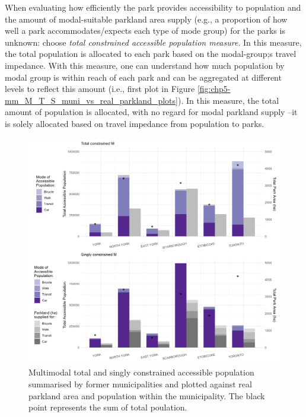 \documentclass[
11pt, %
oneside, %
english, %
singlespacing, %
]{macthesis} %
\begin{document}
When evaluating how efficiently the park provides accessibility to population and the amount of modal-suitable parkland area supply (e.g., a proportion of how well a park accommodates/expects each type of mode group) for the parks is unknown: choose \emph{total constrained accessible population measure}. In this measure, the total population is allocated to each park based on the modal-group;s travel impedance. With this measure, one can understand how much population by modal group is within reach of each park and can be aggregated at different levels to reflect this amount (i.e., first plot in Figure \ref{fig:chp5-mm_M_T_S_muni_vs_real_parkland_plots}). In this measure, the total amount of population is allocated, with no regard for modal parkland supply --it is solely allocated based on travel impedance from population to parks.

\begin{figure}

{\centering \includegraphics[width=6in]{./data/figures/chp5-mm_M_T_S_muni_vs_real_parkland_plots} 

}

\caption{\label{fig:chp5-mm_M_T_S_muni_vs_real_parkland_plots} Multimodal total and singly constrained accessible population summarised by former municipalities and plotted against real parkland area and population within the municipality. The black point represents the sum of total poulation.}\label{fig:unnamed-chunk-92}
\end{figure}
\end{document}

